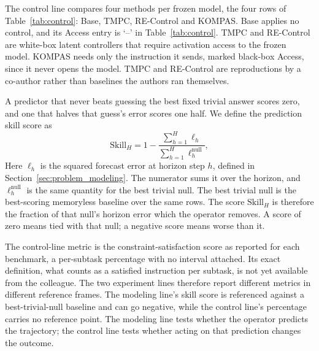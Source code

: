 The control line compares four methods per frozen model, the four rows of Table~\ref{tab:control}: Base, TMPC, RE-Control and KOMPAS.  %
Base applies no control, and its Access entry is `--' in Table~\ref{tab:control}.  %
TMPC and RE-Control are white-box latent controllers that require activation access to the frozen model.  %
KOMPAS needs only the instruction it sends, marked black-box Access, since it never opens the model.  %
TMPC and RE-Control are reproductions by a co-author rather than baselines the authors ran themselves.  %

A predictor that never beats guessing the best fixed trivial answer scores zero, and one that halves that guess's error scores one half.
We define the prediction skill score as
\begin{equation}
    \mathrm{Skill}_H
    =
    1-\frac{\sum_{h=1}^{H}\ell_h}{\sum_{h=1}^{H}\ell_h^{\mathrm{null}}},
    \label{eq:skill}
\end{equation}
Here $\ell_h$ is the squared forecast error at horizon step $h$, defined in Section~\ref{sec:problem_modeling}.  %
The numerator sums it over the horizon, and $\ell_h^{\mathrm{null}}$ is the same quantity for the best trivial null.  %
The best trivial null is the best-scoring memoryless baseline over the same rows.
The score $\mathrm{Skill}_H$ is therefore the fraction of that null's horizon error which the operator removes.  %
A score of zero means tied with that null; a negative score means worse than it.

The control-line metric is the constraint-satisfaction score as reported for each benchmark, a per-subtask percentage with no interval attached.  %
Its exact definition, what counts as a satisfied instruction per subtask, is not yet available from the colleague.
The two experiment lines therefore report different metrics in different reference frames.
The modeling line's skill score is referenced against a best-trivial-null baseline and can go negative, while the control line's percentage carries no reference point.
The modeling line tests whether the operator predicts the trajectory; the control line tests whether acting on that prediction changes the outcome.
